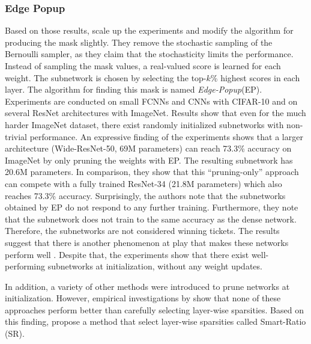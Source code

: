 \subsubsection{Edge Popup}
Based on those results, \textcite{DBLP:conf/cvpr/RamanujanWKFR20} scale up the experiments and modify the algorithm for producing the mask slightly.
They remove the stochastic sampling of the Bernoulli sampler, as they claim that the stochasticity limits the performance. 
Instead of sampling the mask values, a real-valued score is learned for each weight. 
The subnetwork is chosen by selecting the top-$k$\% highest scores in each layer.
The algorithm for finding this mask is named \textit{Edge-Popup}(EP).
Experiments are conducted on small FCNNs and CNNs with CIFAR-10 and on several ResNet architectures with ImageNet.
Results show that even for the much harder ImageNet dataset, there exist randomly initialized subnetworks with non-trivial performance. 
An expressive finding of the experiments shows that a larger architecture (Wide-ResNet-50, 69M parameters) can reach 73.3\% accuracy on ImageNet by only pruning the weights with EP.
The resulting subnetwork has 20.6M parameters. In comparison, they show that this “pruning-only” approach can compete with a fully trained ResNet-34 (21.8M parameters) which also reaches 73.3\% accuracy. 
Surprisingly, the authors note that the subnetworks obtained by EP do not respond to any further training.
Furthermore, they note that the subnetwork does not train to the same accuracy as the dense network.
Therefore, the subnetworks are not considered winning tickets.
The results suggest that there is another phenomenon at play that makes these networks perform well \autocite{DBLP:conf/cvpr/RamanujanWKFR20}.
Despite that, the experiments show that there exist well-performing subnetworks at initialization, without any weight updates.

In addition, a variety of other methods \autocite{GraSP,SNIP,SynFlow} were introduced to prune networks at initialization. However, empirical investigations by \textcite{PruningAtInitMissingTheMark, SanityCheckingPruningMethods} show that none of these approaches perform better than carefully selecting layer-wise sparsities.
Based on this finding, \autocite{SanityCheckingPruningMethods} propose a method that select layer-wise sparsities called Smart-Ratio (SR).
